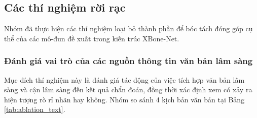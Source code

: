 


\subsection{Các thí nghiệm rời rạc}

Nhóm đã thực hiện các thí nghiệm loại bỏ thành phần để bóc tách đóng góp cụ thể của các mô-đun đề xuất trong kiến trúc XBone-Net.

\subsubsection{Đánh giá vai trò của các nguồn thông tin văn bản lâm sàng}
Mục đích thí nghiệm này là đánh giá tác động của việc tích hợp văn bản lâm sàng và cận lâm sàng đến kết quả chẩn đoán, đồng thời xác định xem có xảy ra hiện tượng rò rỉ nhãn hay không. Nhóm so sánh 4 kịch bản văn bản tại Bảng \ref{tab:ablation_text}.

\begin{table}[htbp]
\centering
{}
\end{table}

